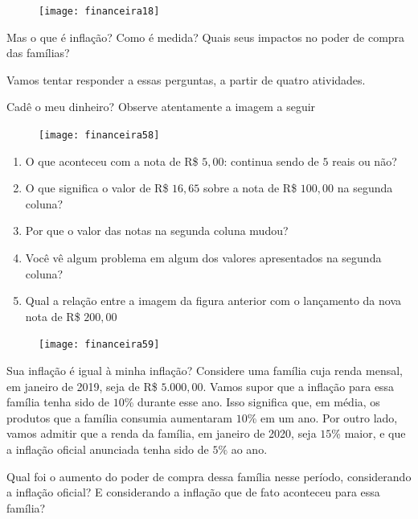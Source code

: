 \begin{figure}[H]
\centering

\texttt{[image: financeira18]}
\end{figure}

Mas o que é inflação? Como é medida? Quais seus impactos no poder de compra das famílias?

Vamos tentar responder a essas perguntas, a partir de quatro atividades.

\begin{task}{Cadê o meu dinheiro?}
\label{fin-ativ-29}
Observe atentamente a imagem a seguir

\begin{figure}[H]
\centering

\texttt{[image: financeira58]}
\end{figure}
\begin{enumerate}
\item O que aconteceu com a nota de R\$ $5{,}00$: continua sendo de $5$ reais ou não?
\item O que significa o valor de R\$ $16{,}65$ sobre a nota de R\$ $100{,}00$ na segunda coluna?
\item Por que o valor das notas na segunda coluna mudou?
\item Você vê algum problema em algum dos valores apresentados na segunda coluna?
\item Qual a relação entre a imagem da figura anterior com o lançamento da nova nota de R\$ $200{,}00$
\end{enumerate}
\begin{figure}[H]
\centering

\texttt{[image: financeira59]}
\end{figure}
\end{task}

\begin{task}{Sua inflação é igual à minha inflação?}
\label{fin-ativ-30}
Considere uma família cuja renda mensal, em janeiro de 2019, seja de R\$ $5.000{,}00$. Vamos supor que a inflação para essa família tenha sido de $10$\% durante esse ano. Isso significa que, em média, os produtos que a família consumia aumentaram $10$\% em um ano. Por outro lado, vamos admitir que a renda da família, em janeiro de 2020, seja $15$\% maior, e que a inflação oficial anunciada tenha sido de $5\%$ ao ano.

Qual foi o aumento do poder de compra dessa família nesse período, considerando a inflação oficial? E considerando a inflação que de fato aconteceu para essa família?
\end{task}

